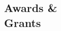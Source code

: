 \documentclass[margin]{res}
\begin{document}
\begin{resume}







\section{Awards \& \\Grants} 


\end{resume}
\end{document}
